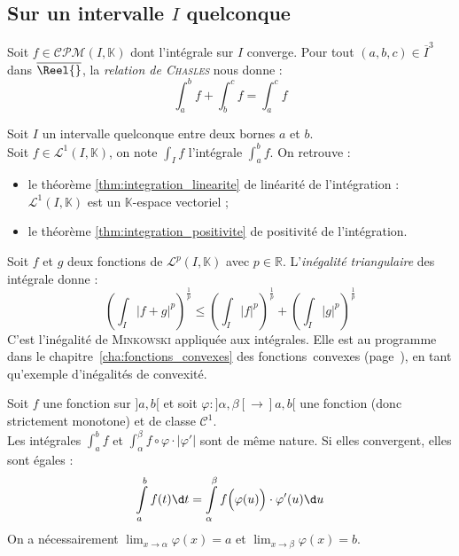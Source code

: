 \documentclass[11pt,a4paper,fleqn,pdftex]{report}
\begin{document}
\subsection{Sur un intervalle $I$ quelconque} %
\label{sub:sur_un_intervalle_i}
\begin{theorem}
     Soit $f \in \mathcal{CPM}(I,\mathbb{K})$ dont l'intégrale sur $I$ converge. Pour tout $(a,b,c)\in \overline{I}^3$ dans $\overline{\Reel{}}$, la \emph{relation de \textsc{Chasles}} nous donne : 
     \begin{equation}
     \int_a^b f + \int_b^c f = \int_a^c f \tag{Chasles}
     \end{equation}
\end{theorem}
Soit $I$ un intervalle quelconque entre deux bornes $a$ et $b$. \\
Soit $f\in \mathcal{L}^1(I,\mathbb{K})$, on note $\int_I f$ l'intégrale $\int_a^b f$. On retrouve :
\begin{itemize}[label=$-$]
    \item le théorème \ref{thm:integration_linearite} de linéarité de l'intégration : $\mathcal{L}^1(I,\mathbb{K})$ est un $\mathbb{K}$-espace vectoriel ;
    \item le théorème \ref{thm:integration_positivite} de positivité de l'intégration.
\end{itemize}
\begin{theorem}
    Soit $f$ et $g$ deux fonctions de $\mathcal{L}^p(I,\mathbb{K})$ avec $p\in \mathbb{R}$. L'\emph{inégalité triangulaire} des intégrale donne :
     \begin{equation}
     \left(\int_I|f+g|^p \right)^{\frac 1 p} \leq \left(\int_I|f|^p\right)^{\frac 1 p}+\left(\int_I|g|^p\right)^{\frac 1 p}
     \end{equation}
     C'est l'inégalité de \textsc{Minkowski} appliquée aux intégrales. Elle est au programme dans le chapitre~\ref{cha:fonctions_convexes} des fonctions~convexes (page~\pageref{cha:fonctions_convexes}), en tant qu'\og{}exemple d'inégalités de convexité\fg{}.
\end{theorem}
\begin{itheorem}
     Soit $f$ une fonction  sur $]a,b[$ et soit ${\varphi : ]\alpha , \beta [ \to ]a,b[}$ une fonction  (donc strictement monotone) et de classe $\mathscr{C}^1$. \\
     Les intégrales $\int_a^b f$ et $\int_\alpha^\beta f\circ \varphi \cdot |\varphi'|$ sont de même nature. Si elles convergent, elles sont égales : 
     \begin{equation}
     \int \limits_a^b f(t)\d t = \int \limits_\alpha^\beta f\Big(\varphi(u)\Big)\cdot \varphi'(u) \d u
     \end{equation}
      On a nécessairement $\lim_{x\to \alpha} \varphi (x) = a$ et $\lim_{x\to \beta} \varphi (x) = b$.
\end{itheorem}
\end{document}
